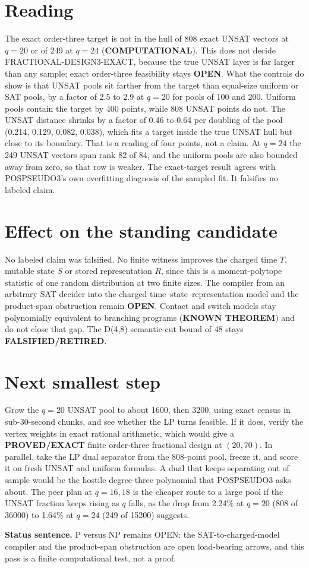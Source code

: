 \documentclass[11pt]{article}
\begin{document}
\section*{Reading}
The exact order-three target is not in the hull of 808 exact UNSAT vectors at $q=20$ or of 249 at $q=24$ (\textbf{COMPUTATIONAL}). This does not decide FRACTIONAL-DESIGN3-EXACT, because the true UNSAT layer is far larger than any sample; exact order-three feasibility stays \textbf{OPEN}. What the controls do show is that UNSAT pools sit farther from the target than equal-size uniform or SAT pools, by a factor of 2.5 to 2.9 at $q=20$ for pools of 100 and 200. Uniform pools contain the target by 400 points, while 808 UNSAT points do not. The UNSAT distance shrinks by a factor of 0.46 to 0.64 per doubling of the pool (0.214, 0.129, 0.082, 0.038), which fits a target inside the true UNSAT hull but close to its boundary. That is a reading of four points, not a claim. At $q=24$ the 249 UNSAT vectors span rank 82 of 84, and the uniform pools are also bounded away from zero, so that row is weaker. The exact-target result agrees with POSPSEUDO3's own overfitting diagnosis of the sampled fit. It falsifies no labeled claim.

\section*{Effect on the standing candidate}
No labeled claim was falsified. No finite witness improves the charged time $T$, mutable state $S$ or stored representation $R$, since this is a moment-polytope statistic of one random distribution at two finite sizes. The compiler from an arbitrary SAT decider into the charged time--state--representation model and the product-span obstruction remain \textbf{OPEN}. Contact and switch models stay polynomially equivalent to branching programs (\textbf{KNOWN THEOREM}) and do not close that gap. The D(4,8) semantic-cut bound of 48 stays \textbf{FALSIFIED/RETIRED}.

\section*{Next smallest step}
Grow the $q=20$ UNSAT pool to about 1600, then 3200, using exact census in sub-30-second chunks, and see whether the LP turns feasible. If it does, verify the vertex weights in exact rational arithmetic, which would give a \textbf{PROVED/EXACT} finite order-three fractional design at $(20,70)$. In parallel, take the LP dual separator from the 808-point pool, freeze it, and score it on fresh UNSAT and uniform formulas. A dual that keeps separating out of sample would be the hostile degree-three polynomial that POSPSEUDO3 asks about. The peer plan at $q=16,18$ is the cheaper route to a large pool if the UNSAT fraction keeps rising as $q$ falls, as the drop from 2.24\% at $q=20$ (808 of 36000) to 1.64\% at $q=24$ (249 of 15200) suggests.

\bigskip
\noindent\textbf{Status sentence.} P versus NP remains OPEN: the SAT-to-charged-model compiler and the product-span obstruction are open load-bearing arrows, and this pass is a finite computational test, not a proof.
\end{document}
